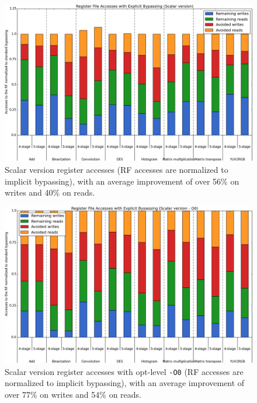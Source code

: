 \begin{figure}[b!]
\centering
\hspace*{-.12in}
\includegraphics[width=\textwidth]{figures/stats/scalar_accesses}
\caption{Scalar version register accesses (RF accesses are normalized to implicit bypassing), with an average improvement of over 56\% on writes and 40\% on reads.}
\label{fig:scalar_improvements}
\end{figure}



\begin{figure}[H]
\centering
\hspace*{-.12in}
\includegraphics[width=\textwidth]{figures/stats/scalar_accesses_O0}
\caption{Scalar version register accesses with opt-level \texttt{-O0} (RF accesses are normalized to implicit bypassing), with an average improvement of over 77\% on writes and 54\% on reads.}
\label{fig:scalar_improvements_O0}
\end{figure}

